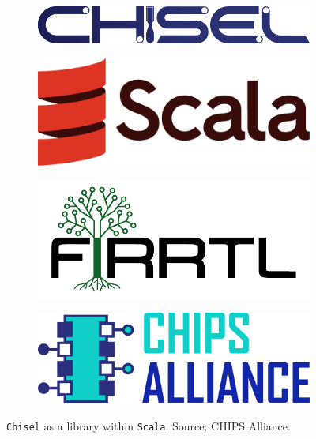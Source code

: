 \begin{figure}[htbp]
    \centering
    \begin{subfigure}[b]{0.3\textwidth}
        \centering
        \includegraphics[width=\linewidth]{Images/Chisel_logo.pdf}
    \end{subfigure}%
    \hfill
    \begin{subfigure}[b]{0.18\textwidth}
        \centering
        \includegraphics[width=\linewidth]{Images/Chisel_Scala_Logo.pdf}
    \end{subfigure}%
    \hfill
    \begin{subfigure}[b]{0.18\textwidth}
        \centering
        \includegraphics[width=\linewidth]{Images/Chisel_FIRRTL.pdf}
    \end{subfigure}%
    \hfill
    \begin{subfigure}[b]{0.2\textwidth}
        \centering
        \includegraphics[width=\linewidth]{Images/Chisel_ChipsAlliance.pdf}
    \end{subfigure}
    \caption{\texttt{Chisel} as a library within \texttt{Scala}. Source: CHIPS Alliance.}
    \label{fig:chisel_ecosystem_logos}
\end{figure}

